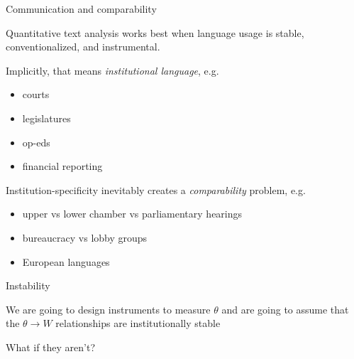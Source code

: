 \documentclass{hertieteaching}\usepackage[]{graphicx}\usepackage[]{color}
\begin{document}
\begin{frame}{Communication and comparability}

Quantitative text analysis works best when language usage is
stable, conventionalized, and instrumental.

Implicitly, that means \textit{institutional language}, e.g.
\begin{itemize}
  \item courts
  \item legislatures
  \item op-eds
  \item financial reporting
\end{itemize}

Institution-specificity inevitably creates a
\textit{comparability} problem, e.g.
\begin{itemize}
  \item upper vs lower chamber vs parliamentary hearings
  \item bureaucracy vs lobby groups \parencite{Kluver2009}
  \item European languages \parencite{Proksch.etal2019}
\end{itemize}

\end{frame}

\begin{frame}{Instability}

We are going to design instruments to measure $\theta$ and are going to assume that the $\theta \longrightarrow W$ relationships are institutionally stable

What if they aren't?

\end{frame}
\end{document}
